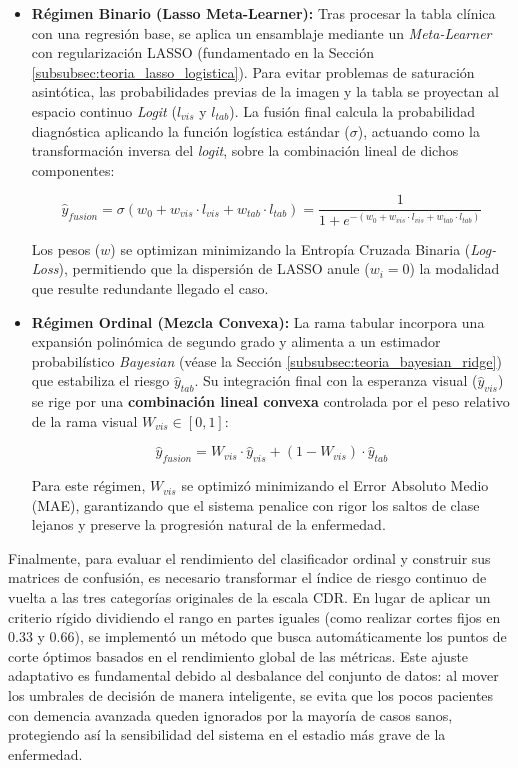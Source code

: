 \documentclass[12pt, oneside, english, spanish]{book}
\begin{document}
\begin{itemize}
	\item \textbf{Régimen Binario (Lasso Meta-Learner):} Tras procesar la tabla clínica con una regresión base, se aplica un ensamblaje mediante un \textit{Meta-Learner} con regularización LASSO (fundamentado en la Sección \ref{subsubsec:teoria_lasso_logistica}). Para evitar problemas de saturación asintótica, las probabilidades previas de la imagen y la tabla se proyectan al espacio continuo \textit{Logit} ($l_{vis}$ y $l_{tab}$). La fusión final calcula la probabilidad diagnóstica aplicando la función logística estándar ($\sigma$), actuando como la transformación inversa del \textit{logit}, sobre la combinación lineal de dichos componentes:
	
	\begin{equation}
		\hat{y}_{fusion} = \sigma \left( w_0 + w_{vis} \cdot l_{vis} + w_{tab} \cdot l_{tab} \right) = \frac{1}{1 + e^{-(w_0 + w_{vis} \cdot l_{vis} + w_{tab} \cdot l_{tab})}}
	\end{equation}
	
	Los pesos ($w$) se optimizan minimizando la Entropía Cruzada Binaria (\textit{Log-Loss}), permitiendo que la dispersión de LASSO anule ($w_i = 0$) la modalidad que resulte redundante llegado el caso.
	
	\item \textbf{Régimen Ordinal (Mezcla Convexa):} La rama tabular incorpora una expansión polinómica de segundo grado y alimenta a un estimador probabilístico \textit{Bayesian } (véase la Sección \ref{subsubsec:teoria_bayesian_ridge}) que estabiliza el riesgo $\hat{y}_{tab}$. Su integración final con la esperanza visual ($\hat{y}_{vis}$) se rige por una \textbf{combinación lineal convexa} controlada por el peso relativo de la rama visual $W_{vis} \in [0, 1]$:
	
	\begin{equation}
		\hat{y}_{fusion} = W_{vis} \cdot \hat{y}_{vis} + (1 - W_{vis}) \cdot \hat{y}_{tab}
	\end{equation}
	
	Para este régimen, $W_{vis}$ se optimizó minimizando el Error Absoluto Medio (MAE), garantizando que el sistema penalice con rigor los saltos de clase lejanos y preserve la progresión natural de la enfermedad.
\end{itemize}

Finalmente, para evaluar el rendimiento del clasificador ordinal y construir sus matrices de confusión, es necesario transformar el índice de riesgo continuo de vuelta a las tres categorías originales de la escala CDR. En lugar de aplicar un criterio rígido dividiendo el rango en partes iguales (como realizar cortes fijos en 0.33 y 0.66), se implementó un método que busca automáticamente los puntos de corte óptimos basados en el rendimiento global de las métricas. Este ajuste adaptativo es fundamental debido al desbalance del conjunto de datos: al mover los umbrales de decisión de manera inteligente, se evita que los pocos pacientes con demencia avanzada queden ignorados por la mayoría de casos sanos, protegiendo así la sensibilidad del sistema en el estadio más grave de la enfermedad.
\end{document}
